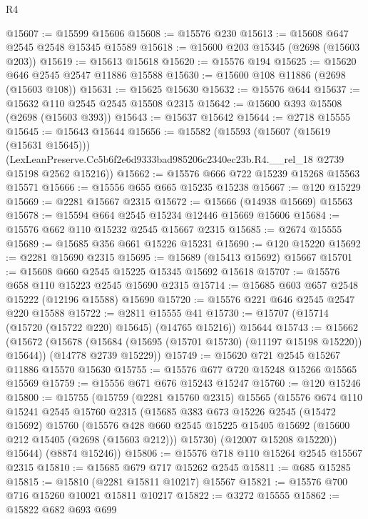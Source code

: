 \begin{lexlean}{R4}
\begin{coremodule}
@15607 := @15599 @15606
@15608 := @15576 @230
@15613 := @15608 @647 @2545 @2548 @15345 @15589
@15618 := @15600 @203 @15345 (@2698 (@15603 @203))
@15619 := @15613 @15618
@15620 := @15576 @194
@15625 := @15620 @646 @2545 @2547 @11886 @15588
@15630 := @15600 @108 @11886 (@2698 (@15603 @108))
@15631 := @15625 @15630
@15632 := @15576 @644
@15637 := @15632 @110 @2545 @2545 @15508 @2315
@15642 := @15600 @393 @15508 (@2698 (@15603 @393))
@15643 := @15637 @15642
@15644 := @2718 @15555
@15645 := @15643 @15644
@15656 := @15582
    (@15593
      (@15607 (@15619 (@15631 @15645)))
      (LexLeanPreserve.Cc5b6f2e6d9333bad985206c2340ec23b.R4.__rel_18 @2739 @15198 @2562 @15216))
@15662 := @15576 @666 @722 @15239 @15268 @15563 @15571
@15666 := @15556 @655 @665 @15235 @15238
@15667 := @120 @15229
@15669 := @2281 @15667 @2315
@15672 := @15666 (@14938 @15669) @15563
@15678 := @15594 @664 @2545 @15234 @12446 @15669 @15606
@15684 := @15576 @662 @110 @15232 @2545 @15667 @2315
@15685 := @2674 @15555
@15689 := @15685 @356 @661 @15226 @15231
@15690 := @120 @15220
@15692 := @2281 @15690 @2315
@15695 := @15689 (@15413 @15692) @15667
@15701 := @15608 @660 @2545 @15225 @15345 @15692 @15618
@15707 := @15576 @658 @110 @15223 @2545 @15690 @2315
@15714 := @15685 @603 @657 @2548 @15222 (@12196 @15588) @15690
@15720 := @15576 @221 @646 @2545 @2547 @220 @15588
@15722 := @2811 @15555 @41
@15730 := @15707 (@15714 (@15720 (@15722 @220) @15645) (@14765 @15216)) @15644
@15743 := @15662
    (@15672
      (@15678 (@15684 (@15695 (@15701 @15730) (@11197 @15198 @15220)) @15644))
      (@14778 @2739 @15229))
@15749 := @15620 @721 @2545 @15267 @11886 @15570 @15630
@15755 := @15576 @677 @720 @15248 @15266 @15565 @15569
@15759 := @15556 @671 @676 @15243 @15247
@15760 := @120 @15246
@15800 := @15755
    (@15759
      (@2281 @15760 @2315)
      @15565
      (@15576
        @674
        @110
        @15241
        @2545
        @15760
        @2315
        (@15685
          @383
          @673
          @15226
          @2545
          (@15472 @15692)
          @15760
          (@15576
            @428
            @660
            @2545
            @15225
            @15405
            @15692
            (@15600 @212 @15405 (@2698 (@15603 @212)))
            @15730)
          (@12007 @15208 @15220))
        @15644)
      (@8874 @15246))
@15806 := @15576 @718 @110 @15264 @2545 @15567 @2315
@15810 := @15685 @679 @717 @15262 @2545
@15811 := @685 @15285
@15815 := @15810 (@2281 @15811 @10217) @15567
@15821 := @15576 @700 @716 @15260 @10021 @15811 @10217
@15822 := @3272 @15555
@15862 := @15822
    @682
    @693
    @699

\end{coremodule}
\end{lexlean}
